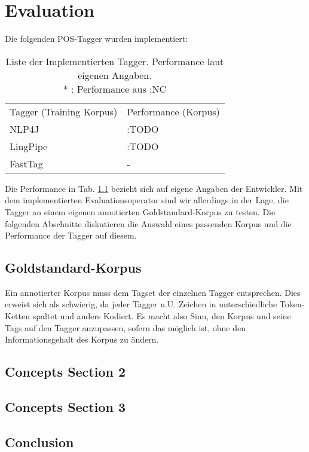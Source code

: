 %
\chapter{Evaluation}
\label{sec:eval}

Die folgenden POS-Tagger wurden implementiert:

\begin{table}[htb]
\begin{tabular}{l|l}
Tagger (Training Korpus) & Performance (Korpus)  \\
\cline{1-2}
NLP4J  & :TODO  	\\
LingPipe & :TODO 	\\
FastTag & -           
\end{tabular}
\caption{Liste der Implementierten Tagger. Performance laut eigenen Angaben.\\ \mbox{*} : Performance aus :NC }
\label{sec:eval:list}
\end{table}

Die Performance in Tab. \ref{sec:eval:list} bezieht sich auf eigene Angaben der Entwickler. Mit dem implementierten Evaluationsoperator sind wir allerdings in der Lage, die Tagger an einem eigenen annotierten Goldstandard-Korpus zu testen. Die folgenden Abschnitte diskutieren die Auswahl eines passenden Korpus und die Performance der Tagger auf diesem.

\section{Goldstandard-Korpus}
\label{sec:eval:corpus}

Ein annotierter Korpus muss dem Tagset der einzelnen Tagger entsprechen. Dies erweist sich als schwierig, da jeder Tagger u.U. Zeichen in unterschiedliche Token-Ketten spaltet und anders Kodiert. Es macht also Sinn, den Korpus und seine Tags auf den Tagger anzupassen, sofern das möglich ist, ohne den Informationsgehalt des Korpus zu ändern.



\section{Concepts Section 2}
\label{sec:concepts:sec2}



\section{Concepts Section 3}
\label{sec:concepts:sec3}



\section{Conclusion}
\label{sec:concepts:conclusion}


